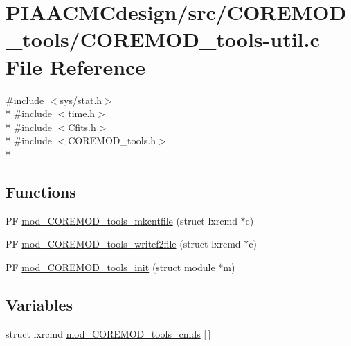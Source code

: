 \hypertarget{PIAACMCdesign_2src_2COREMOD__tools_2COREMOD__tools-util_8c}{\section{P\+I\+A\+A\+C\+M\+Cdesign/src/\+C\+O\+R\+E\+M\+O\+D\+\_\+tools/\+C\+O\+R\+E\+M\+O\+D\+\_\+tools-\/util.c File Reference}
\label{PIAACMCdesign_2src_2COREMOD__tools_2COREMOD__tools-util_8c}
}
{\ttfamily \#include $<$sys/stat.\+h$>$}\\*
{\ttfamily \#include $<$time.\+h$>$}\\*
{\ttfamily \#include $<$Cfits.\+h$>$}\\*
{\ttfamily \#include $<$C\+O\+R\+E\+M\+O\+D\+\_\+tools.\+h$>$}\\*
\subsection*{Functions}
\begin{DoxyCompactItemize}
\item 
P\+F \hyperlink{PIAACMCdesign_2src_2COREMOD__tools_2COREMOD__tools-util_8c_a06f48d4a86a2fdc9584bf9dc2327e489}{mod\+\_\+\+C\+O\+R\+E\+M\+O\+D\+\_\+tools\+\_\+mkcntfile} (struct lxrcmd $\ast$c)
\item 
P\+F \hyperlink{PIAACMCdesign_2src_2COREMOD__tools_2COREMOD__tools-util_8c_ac71b29b59c1655b692adec27db89a5dd}{mod\+\_\+\+C\+O\+R\+E\+M\+O\+D\+\_\+tools\+\_\+writef2file} (struct lxrcmd $\ast$c)
\item 
P\+F \hyperlink{PIAACMCdesign_2src_2COREMOD__tools_2COREMOD__tools-util_8c_aa4a40bdadb3c1cfa417640f3cee38a62}{mod\+\_\+\+C\+O\+R\+E\+M\+O\+D\+\_\+tools\+\_\+init} (struct module $\ast$m)
\end{DoxyCompactItemize}
\subsection*{Variables}
\begin{DoxyCompactItemize}
\item 
struct lxrcmd \hyperlink{PIAACMCdesign_2src_2COREMOD__tools_2COREMOD__tools-util_8c_adcd4eaaac246d65e6d23ad5e6f5d411d}{mod\+\_\+\+C\+O\+R\+E\+M\+O\+D\+\_\+tools\+\_\+cmds} \mbox{[}$\,$\mbox{]}
\end{DoxyCompactItemize}


